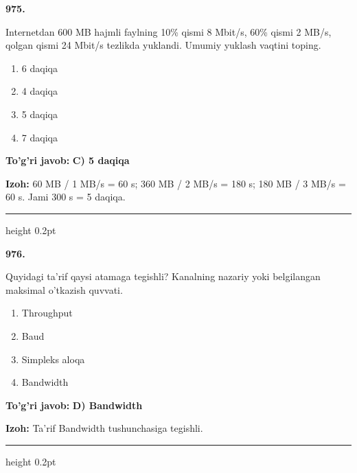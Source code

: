 \documentclass[10pt,a4paper,oneside]{article}
\begin{document}
\noindent\textbf{\color{ink}975.}
\par
Internetdan 600 MB hajmli faylning 10\% qismi 8 Mbit/s, 60\% qismi 2 MB/s, qolgan qismi 24 Mbit/s tezlikda yuklandi. Umumiy yuklash vaqtini toping.
\begin{enumerate}[label=\Alph*),leftmargin=9mm]
\item 6 daqiqa
\item 4 daqiqa
\item 5 daqiqa
\item 7 daqiqa
\end{enumerate}
\begin{tcolorbox}[enhanced,breakable,colback=teal!4,colframe=teal!50!black,boxrule=0.5pt,arc=1.1mm,left=3mm,right=3mm,top=1.7mm,bottom=1.7mm,before skip=2mm,after skip=2mm]
\textbf{\color{teal}To'g'ri javob:} \textbf{C) 5 daqiqa}
\par\smallskip
\textbf{Izoh:} 60 MB / 1 MB/s = 60 s; 360 MB / 2 MB/s = 180 s; 180 MB / 3 MB/s = 60 s. Jami 300 s = 5 daqiqa.
\end{tcolorbox}
\vspace{2mm}\hrule height 0.2pt \vspace{3mm}

\noindent\textbf{\color{ink}976.}
\par
Quyidagi ta'rif qaysi atamaga tegishli? Kanalning nazariy yoki belgilangan maksimal o'tkazish quvvati.
\begin{enumerate}[label=\Alph*),leftmargin=9mm]
\item Throughput
\item Baud
\item Simpleks aloqa
\item Bandwidth
\end{enumerate}
\begin{tcolorbox}[enhanced,breakable,colback=teal!4,colframe=teal!50!black,boxrule=0.5pt,arc=1.1mm,left=3mm,right=3mm,top=1.7mm,bottom=1.7mm,before skip=2mm,after skip=2mm]
\textbf{\color{teal}To'g'ri javob:} \textbf{D) Bandwidth}
\par\smallskip
\textbf{Izoh:} Ta'rif Bandwidth tushunchasiga tegishli.
\end{tcolorbox}
\vspace{2mm}\hrule height 0.2pt \vspace{3mm}
\end{document}
